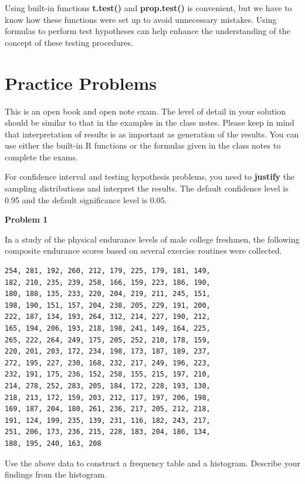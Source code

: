 \documentclass[
]{book}
\begin{document}
Using built-in functions \textbf{t.test()} and \textbf{prop.test()} is convenient, but we have to know how these functions were set up to avoid unnecessary mistakes. Using formulas to perform test hypotheses can help enhance the understanding of the concept of these testing procedures.

\hypertarget{practice-problems}{%
\section{Practice Problems}\label{practice-problems}}

This is an open book and open note exam. The level of detail in your solution should be similar to that in the examples in the class notes. Please keep in mind that interpretation of results is as important as generation of the results. You can use either the built-in R functions or the formulas given in the class notes to complete the exams.

For confidence interval and testing hypothesis problems, you need to \textbf{justify} the sampling distributions and interpret the results. The default confidence level is 0.95 and the default significance level is 0.05.

\textbf{Problem 1}

In a study of the physical endurance levels of male college freshmen, the following composite endurance scores based on several exercise routines were collected.

\begin{verbatim}
254, 281, 192, 260, 212, 179, 225, 179, 181, 149, 
182, 210, 235, 239, 258, 166, 159, 223, 186, 190,
180, 188, 135, 233, 220, 204, 219, 211, 245, 151, 
198, 190, 151, 157, 204, 238, 205, 229, 191, 200,
222, 187, 134, 193, 264, 312, 214, 227, 190, 212, 
165, 194, 206, 193, 218, 198, 241, 149, 164, 225,
265, 222, 264, 249, 175, 205, 252, 210, 178, 159, 
220, 201, 203, 172, 234, 198, 173, 187, 189, 237,
272, 195, 227, 230, 168, 232, 217, 249, 196, 223,
232, 191, 175, 236, 152, 258, 155, 215, 197, 210,
214, 278, 252, 283, 205, 184, 172, 228, 193, 130,
218, 213, 172, 159, 203, 212, 117, 197, 206, 198,
169, 187, 204, 180, 261, 236, 217, 205, 212, 218,
191, 124, 199, 235, 139, 231, 116, 182, 243, 217,
251, 206, 173, 236, 215, 228, 183, 204, 186, 134,
188, 195, 240, 163, 208
\end{verbatim}

Use the above data to construct a frequency table and a histogram. Describe your findings from the histogram.
\end{document}
